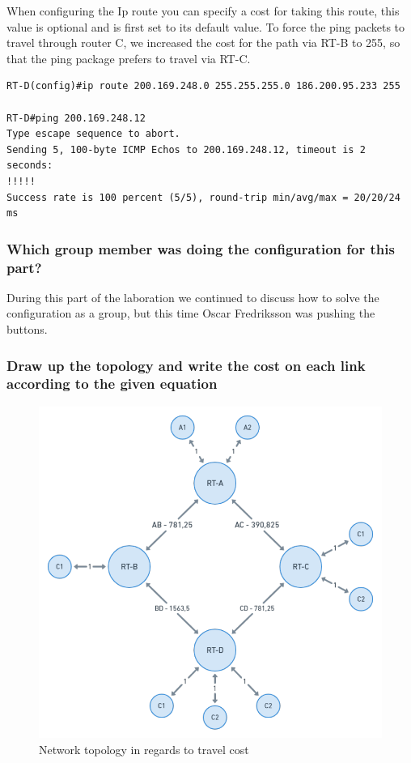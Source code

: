 \documentclass[a4paper, titlepage,12pt]{article}
\begin{document}
		When configuring the Ip route you can specify a cost for taking this route, this value is optional and is first set to its default value. To force the ping packets to travel through router C, we increased the cost for the path via RT-B to 255, so that the ping package prefers to travel via RT-C. 

\begin{verbatim}
RT-D(config)#ip route 200.169.248.0 255.255.255.0 186.200.95.233 255

RT-D#ping 200.169.248.12
Type escape sequence to abort.
Sending 5, 100-byte ICMP Echos to 200.169.248.12, timeout is 2 seconds:
!!!!!
Success rate is 100 percent (5/5), round-trip min/avg/max = 20/20/24 ms
\end{verbatim}

		\subsubsection{Which group member was doing the configuration for this part?}

		During this part of the laboration we continued to discuss how to solve the configuration as a group, but this time Oscar Fredriksson was pushing the buttons. 

		\subsubsection{Draw up the topology and write the cost on each link according to the given equation}

		\begin{figure}[H]
			\begin{center}
				\includegraphics[scale=0.30]{./djikstra_manual.png}
			\end{center}
			\caption{Network topology in regards to travel cost}
		\end{figure}
\end{document}

